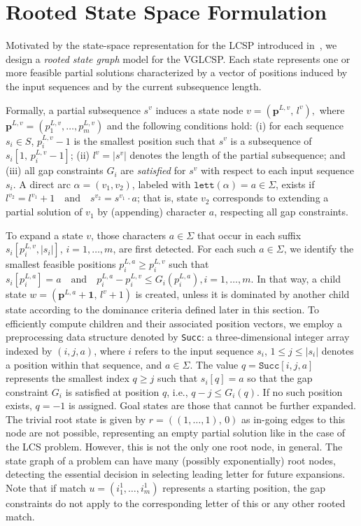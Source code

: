 \documentclass[runningheads]{llncs}
\begin{document}
	
	\section{Rooted State Space Formulation}\label{sec: state_graph}


Motivated by the state-space representation for the LCSP introduced in~\cite{DJUKANOVIC2020106499}, we design a \emph{rooted state graph} model for the VGLCSP. Each state represents one or more feasible partial solutions characterized by a vector of positions induced by the input sequences and by the current subsequence length. 

Formally, a partial subsequence $s^v$ induces a state node $
v = (\mathbf{p}^{L,v},\, l^v),$ 
where $\mathbf{p}^{L,v} = (p^{L,v}_1,\ldots,p^{L,v}_m)$ and the following conditions hold:
(i) for each sequence $s_i \in S$, $p^{L,v}_i - 1$ is the smallest position such that $s^v$ is a subsequence of $s_i[1,\, p^{L,v}_i - 1]$;
(ii) $l^v = |s^v|$ denotes the length of the partial subsequence; and
(iii) all gap constraints $G_i$ are \textit{satisfied} for $s^v$ with respect to each input sequence $s_i$. A direct arc $\alpha = (v_1, v_2)$, labeled with $\texttt{lett}(\alpha) = a \in \Sigma$, exists if $
l^{v_2} = l^{v_1} + 1
\quad \text{and} \quad
s^{v_2} = s^{v_1} \cdot a$; 
that is, state $v_2$ corresponds to extending a partial solution of $v_1$ by (appending) character $a$, respecting all gap constraints. 

To expand a state $v$, those characters $a \in \Sigma$ that occur in each suffix  $s_i[p^{L,v}_i, |s_i|]$, $i = 1,\ldots,m$, are first detected. For each such $a \in \Sigma$, we identify the smallest feasible positions $p^{L,a}_i \ge p^{L,v}_i$ such that
$
s_i[p^{L,a}_i] = a
\quad \text{and} \quad
p^{L,a}_i - p^{L,v}_i \le G_i(p^{L,a}_i), i = 1,\ldots,m.
$ 
In that way, a child state
$w = (\mathbf{p}^{L,a} + \mathbf{1},\, l^v + 1)$
is created, unless it is dominated by another child state according to the dominance criteria defined later in this section. To efficiently compute children and their associated position vectors, we employ a preprocessing data structure denoted by \texttt{Succ}: a three-dimensional integer array indexed by $(i,j, a)$, where $i$ refers to the input sequence $s_i$, $1 \le j \le |s_i|$ denotes a position within that sequence, and $a \in \Sigma$. The value $q = \texttt{Succ}[i,j,a]$
represents the smallest index $q \ge j$ such that $s_i[q] = a$ so that the gap constraint $G_i$ is satisfied at position $q$, i.e.,  $q - j \le G_i(q).$ 
If no such position exists, $q=-1$ is assigned.  Goal states are those that cannot be further expanded.    The trivial root state is given by $ r = ((1,\ldots,1),\, 0)$ as in-going edges to this node are not possible,   representing an empty partial solution like in the case of the LCS problem. However, this is not the only one root node, in general. The state graph of a problem can have many (possibly exponentially) root nodes, detecting the essential decision in selecting leading letter for future  expansions. %
Note that if match $u=(i^1_1, \ldots, i^1_m)$ represents a starting position,   the gap constraints do not apply to the corresponding letter of this or any other  rooted match. 
\end{document}
